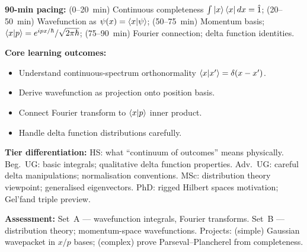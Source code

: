 \documentclass[11pt,a4paper]{article}
\begin{document}
\medskip
\begin{tcolorbox}[modulebox, title={Module~I.2 --- Lecture L06: Continuous Bases: $\ket{x}$, $\ket{p}$ \& Delta Functions}]
\textbf{90-min pacing:} (0--20~min) Continuous completeness $\int\ket{x}\bra{x}dx=\hat{1}$;
(20--50~min) Wavefunction as $\psi(x)=\braket{x|\psi}$;
(50--75~min) Momentum basis; $\braket{x|p}=e^{ipx/\hbar}/\sqrt{2\pi\hbar}$;
(75--90~min) Fourier connection; delta function identities.

\medskip\textbf{Core learning outcomes:}
\begin{itemize}[leftmargin=1.4em,topsep=2pt,itemsep=1pt]
  \item Understand continuous-spectrum orthonormality $\braket{x|x'}=\delta(x-x')$.
  \item Derive wavefunction as projection onto position basis.
  \item Connect Fourier transform to $\braket{x|p}$ inner product.
  \item Handle delta function distributions carefully.
\end{itemize}

\medskip\textbf{Tier differentiation:}
HS: what ``continuum of outcomes'' means physically.
Beg.\ UG: basic integrals; qualitative delta function properties.
Adv.\ UG: careful delta manipulations; normalisation conventions.
MSc: distribution theory viewpoint; generalised eigenvectors.
PhD: rigged Hilbert spaces motivation; Gel'fand triple preview.

\medskip\textbf{Assessment:}
Set~A --- wavefunction integrals, Fourier transforms.
Set~B --- distribution theory; momentum-space wavefunctions.
Projects: (simple) Gaussian wavepacket in $x/p$ bases; (complex) prove Parseval--Plancherel from completeness.
\end{tcolorbox}
\end{document}
